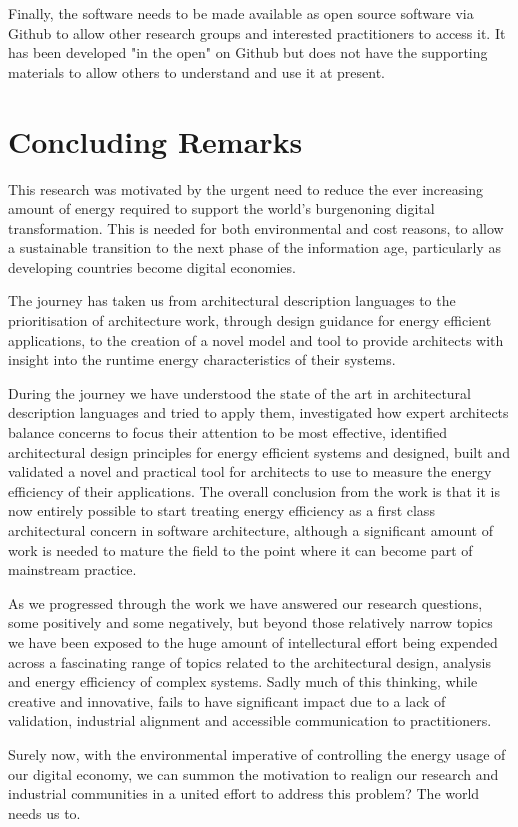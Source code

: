 Finally, the software needs to be made available as open source software via Github to allow other research groups and interested practitioners to access it.  It has been developed "in the open" on Github but does not have the supporting materials to allow others to understand and use it at present.

\section{Concluding Remarks}

This research was motivated by the urgent need to reduce the ever increasing amount of energy required to support the world's burgenoning digital transformation.  This is needed for both environmental and cost reasons, to allow a sustainable transition to the next phase of the information age, particularly as developing countries become digital economies.

The journey has taken us from architectural description languages to the prioritisation of architecture work, through design guidance for energy efficient applications, to the creation of a novel model and tool to provide architects with insight into the runtime energy characteristics of their systems.

During the journey we have understood the state of the art in architectural description languages and tried to apply them, investigated how expert architects balance concerns to focus their attention to be most effective, identified architectural design principles for energy efficient systems and designed, built and validated a novel and practical tool for architects to use to measure the energy efficiency of their applications.  The overall conclusion from the work is that it is now entirely possible to start treating energy efficiency as a first class architectural concern in software architecture, although a significant amount of work is needed to mature the field to the point where it can become part of mainstream practice.

As we progressed through the work we have answered our research questions, some positively and some negatively, but beyond those relatively narrow topics we have been exposed to the huge amount of intellectural effort being expended across a fascinating range of topics related to the architectural design, analysis and energy efficiency of complex systems.  Sadly much of this thinking, while creative and innovative, fails to have significant impact due to a lack of validation, industrial alignment and accessible communication to practitioners.

Surely now, with the environmental imperative of controlling the energy usage of our digital economy, we can summon the motivation to realign our research and industrial communities in a united effort to address this problem?  The world needs us to.


